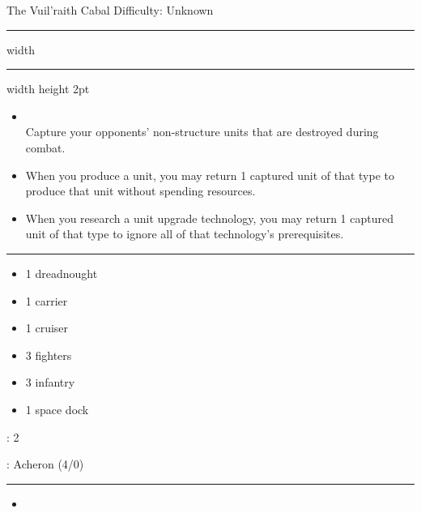 {\handel\Huge The Vuil'raith Cabal} \hfill {\Large Difficulty: Unknown} \vspace{-4pt}\\
\hrule width \hsize \kern 1mm \hrule width \hsize height 2pt


\begin{multicols}{2}


\begin{itemize}
\item {}\\
Capture your opponents' non-structure units that are destroyed during combat.
\item {} When you produce a unit, you may return 1 captured unit of that type to produce that unit without spending resources.
\item {} When you research a unit upgrade technology, you may return 1 captured unit of that type to ignore all of that technology's prerequisites.
\end{itemize}


\vspace{-10pt}\rule{\hsize}{0.4pt}\vspace{5pt}


\vspace{-5pt}
\begin{multicols}{2}
\begin{itemize}
\item 1 dreadnought
\item 1 carrier
\item 1 cruiser
\item 3 fighters
\item 3 infantry
\item 1 space dock
\end{itemize}
\end{multicols}

\vspace{-5pt}
: 2

\vspace{2pt}
: Acheron (4/0)

\rule{\hsize}{0.4pt}\vspace{5pt}


\begin{itemize}
\item \assembly
\end{itemize}


\end{multicols}
